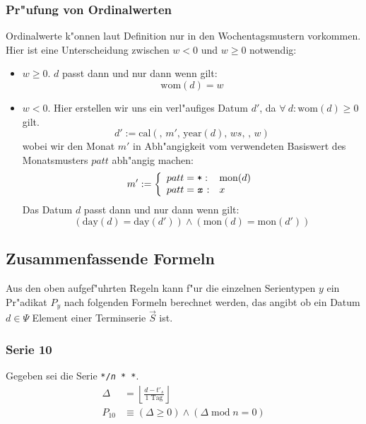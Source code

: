 \documentclass[a4paper]{article}
\newcommand*{\dayf}{\mathrm{day}}
\newcommand*{\monf}{\mathrm{mon}}
\newcommand*{\yearf}{\mathrm{year}}
\newcommand*{\womf}{\mathrm{wom}}
\newcommand*{\calf}{\mathrm{cal}}
\renewcommand{\mod}{\;\mathrm{mod}\;}
\numberwithin{equation}{section}
\begin{document}
\subsubsection{Pr"ufung von Ordinalwerten}
Ordinalwerte k"onnen laut Definition nur in den Wochentagsmustern vorkommen.
Hier ist eine Unterscheidung zwischen $w < 0$ und $w \ge 0$ notwendig:
\begin{itemize}
\item $w \ge 0$. $d$ passt dann und nur dann wenn gilt:
  \begin{equation}\womf(d) = w\end{equation}
\item $w < 0$. Hier erstellen wir uns ein verl"aufiges Datum $d'$,
  da $\forall\ d: \womf(d) \ge 0$ gilt.
  \begin{equation}d' := \calf(,\,m',\,\yearf(d),\,ws,\,,\,w)\end{equation}
  wobei wir den Monat $m'$ in Abh"angigkeit vom verwendeten Basiswert des
  Monatsmusters $patt$ abh"angig machen:
  \begin{equation}
  m' := \left\{\begin{array}{ll}
  patt = \texttt{*} : & \monf(d) \\
  patt = \texttt{\textit{x}} : & x \\
  \end{array}\right.
  \end{equation}
  Das Datum $d$ passt dann und nur dann wenn gilt:
  \begin{equation}
    (\dayf(d) = \dayf(d')) \wedge (\monf(d) = \monf(d'))
  \end{equation}
\end{itemize}


%
%
\subsection{Zusammenfassende Formeln}\label{ssec:dateInSeries}
Aus den oben aufgef"uhrten Regeln kann f"ur die einzelnen Serientypen $y$ ein
Pr"adikat $P_y$ nach folgenden Formeln berechnet werden, das angibt ob ein Datum
$d \in \Psi$ Element einer Terminserie $\vec{S}$ ist.

\subsubsection{Serie 10}
Gegeben sei die Serie \texttt{*/\textit{n} * *}.
\begin{equation}
\begin{split}
  \Delta & = \left\lfloor\frac{d - t'_s}{1 \textrm{ Tag}}\right\rfloor \\
  P_{10} & \equiv (\Delta \ge 0) \wedge (\Delta \mod n = 0)
\end{split}
\end{equation}
\end{document}
